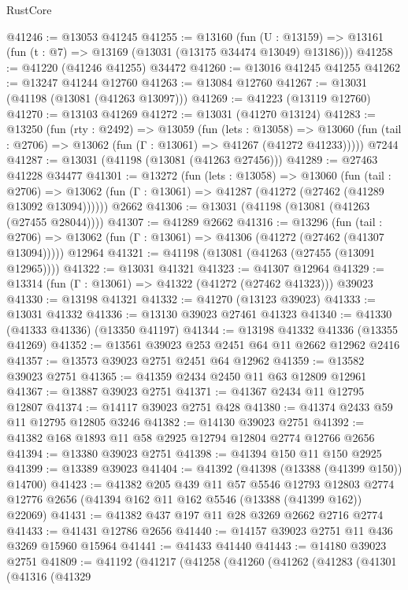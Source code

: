 \begin{lexlean}{RustCore}
\begin{coremodule}
@41246 := @13053 @41245
@41255 := @13160
    (fun (U : @13159) => @13161 (fun (t : @7) => @13169 (@13031 (@13175 @34474 @13049) @13186)))
@41258 := @41220 (@41246 @41255) @34472
@41260 := @13016 @41245 @41255
@41262 := @13247 @41244 @12760
@41263 := @13084 @12760
@41267 := @13031 (@41198 (@13081 (@41263 @13097)))
@41269 := @41223 (@13119 @12760)
@41270 := @13103 @41269
@41272 := @13031 (@41270 @13124)
@41283 := @13250
    (fun (rty : @2492) =>
    @13059
      (fun (lets : @13058) =>
      @13060 (fun (tail : @2706) => @13062 (fun (Γ : @13061) => @41267 (@41272 @41233)))))
    @7244
@41287 := @13031 (@41198 (@13081 (@41263 @27456)))
@41289 := @27463 @41228 @34477
@41301 := @13272
    (fun (lets : @13058) =>
    @13060
      (fun (tail : @2706) =>
      @13062 (fun (Γ : @13061) => @41287 (@41272 (@27462 (@41289 @13092 @13094))))))
    @2662
@41306 := @13031 (@41198 (@13081 (@41263 (@27455 @28044))))
@41307 := @41289 @2662
@41316 := @13296
    (fun (tail : @2706) => @13062 (fun (Γ : @13061) => @41306 (@41272 (@27462 (@41307 @13094)))))
    @12964
@41321 := @41198 (@13081 (@41263 (@27455 (@13091 @12965))))
@41322 := @13031 @41321
@41323 := @41307 @12964
@41329 := @13314 (fun (Γ : @13061) => @41322 (@41272 (@27462 @41323))) @39023
@41330 := @13198 @41321
@41332 := @41270 (@13123 @39023)
@41333 := @13031 @41332
@41336 := @13130 @39023 @27461 @41323
@41340 := @41330 (@41333 @41336) (@13350 @41197)
@41344 := @13198 @41332 @41336 (@13355 @41269)
@41352 := @13561 @39023 @253 @2451 @64 @11 @2662 @12962 @2416
@41357 := @13573 @39023 @2751 @2451 @64 @12962
@41359 := @13582 @39023 @2751
@41365 := @41359 @2434 @2450 @11 @63 @12809 @12961
@41367 := @13887 @39023 @2751
@41371 := @41367 @2434 @11 @12795 @12807
@41374 := @14117 @39023 @2751 @428
@41380 := @41374 @2433 @59 @11 @12795 @12805 @3246
@41382 := @14130 @39023 @2751
@41392 := @41382 @168 @1893 @11 @58 @2925 @12794 @12804 @2774 @12766 @2656
@41394 := @13380 @39023 @2751
@41398 := @41394 @150 @11 @150 @2925
@41399 := @13389 @39023
@41404 := @41392 (@41398 (@13388 (@41399 @150)) @14700)
@41423 := @41382
    @205
    @439
    @11
    @57
    @5546
    @12793
    @12803
    @2774
    @12776
    @2656
    (@41394 @162 @11 @162 @5546 (@13388 (@41399 @162)) @22069)
@41431 := @41382 @437 @197 @11 @28 @3269 @2662 @2716 @2774
@41433 := @41431 @12786 @2656
@41440 := @14157 @39023 @2751 @11 @436 @3269 @15960 @15964
@41441 := @41433 @41440
@41443 := @14180 @39023 @2751
@41809 := @41192
    (@41217
      (@41258
        (@41260
          (@41262
            (@41283
              (@41301
                (@41316
                  (@41329

\end{coremodule}
\end{lexlean}
